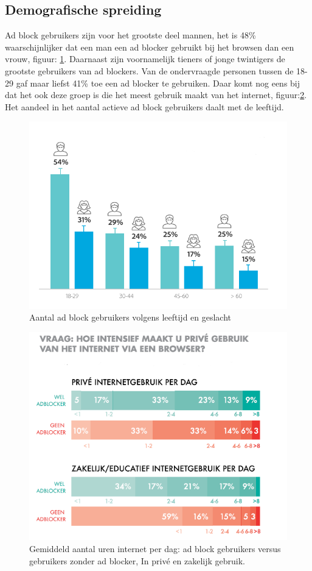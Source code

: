 \documentclass[pdftex,a4paper,12pt,twoside]{report}
\begin{document}
\subsection{Demografische spreiding}
\label{sec Demografische spreiding}
Ad block gebruikers zijn voor het grootste deel mannen, het is 48\% waarschijnlijker dat een man een ad blocker gebruikt bij het browsen dan een vrouw, figuur: \ref{fig: Demographic_age_sex}. Daarnaast zijn voornamelijk tieners of jonge twintigers de grootste gebruikers van ad blockers. Van de ondervraagde personen tussen de 18-29 gaf maar liefst 41\% toe een ad blocker te gebruiken. Daar komt nog eens bij dat het ook deze groep is die het meest gebruik maakt van het internet, figuur:\ref{fig: adbvsnadbHoursofIntertnet}. Het aandeel in het aantal actieve ad block gebruikers daalt met de leeftijd.

\begin{figure}[h!]
\centering
\includegraphics[width=12cm]{img/demographicsMV}
\caption{Aantal ad block gebruikers volgens leeftijd en geslacht}
\label{fig: Demographic_age_sex}
\end{figure}

\begin{figure}[h!]
\centering
\includegraphics[width=12cm]{img/adbvsnadbHoursofIntertnet}
\caption{Gemiddeld aantal uren internet per dag: ad block gebruikers versus gebruikers zonder ad blocker, In privé en zakelijk gebruik. }
\label{fig: adbvsnadbHoursofIntertnet}
\end{figure}
\end{document}
